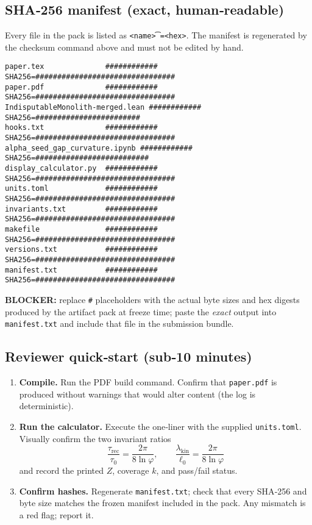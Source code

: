 \documentclass[11pt]{article}
\begin{document}
\subsection*{SHA‑256 manifest (exact, human‑readable)}
Every file in the pack is listed as \texttt{<name>\t<size bytes>=<hex>}. The manifest is regenerated by the checksum command above and must not be edited by hand.
\begin{verbatim}
paper.tex              ############    SHA256=################################
paper.pdf              ############    SHA256=################################
IndisputableMonolith-merged.lean ############ SHA256=########################
hooks.txt              ############    SHA256=################################
alpha_seed_gap_curvature.ipynb ############ SHA256=##########################
display_calculator.py  ############    SHA256=################################
units.toml             ############    SHA256=################################
invariants.txt         ############    SHA256=################################
makefile               ############    SHA256=################################
versions.txt           ############    SHA256=################################
manifest.txt           ############    SHA256=################################
\end{verbatim}
\textbf{BLOCKER:} replace \texttt{\#} placeholders with the actual byte sizes and hex digests produced by the artifact pack at freeze time; paste the \emph{exact} output into \texttt{manifest.txt} and include that file in the submission bundle.

\subsection*{Reviewer quick‑start (sub‑10 minutes)}
\begin{enumerate}
  \item \textbf{Compile.} Run the PDF build command. Confirm that \texttt{paper.pdf} is produced without warnings that would alter content (the log is deterministic).
  \item \textbf{Run the calculator.} Execute the one‑liner with the supplied \texttt{units.toml}. Visually confirm the two invariant ratios
  \[
  \frac{\tau_{\mathrm{rec}}}{\tau_{0}}=\frac{2\pi}{8\ln\varphi},\qquad
  \frac{\lambda_{\mathrm{kin}}}{\ell_{0}}=\frac{2\pi}{8\ln\varphi}
  \]
  and record the printed \(Z\), coverage \(k\), and pass/fail status.
  \item \textbf{Confirm hashes.} Regenerate \texttt{manifest.txt}; check that every SHA‑256 and byte size matches the frozen manifest included in the pack. Any mismatch is a red flag; report it.
\end{enumerate}
\end{document}
